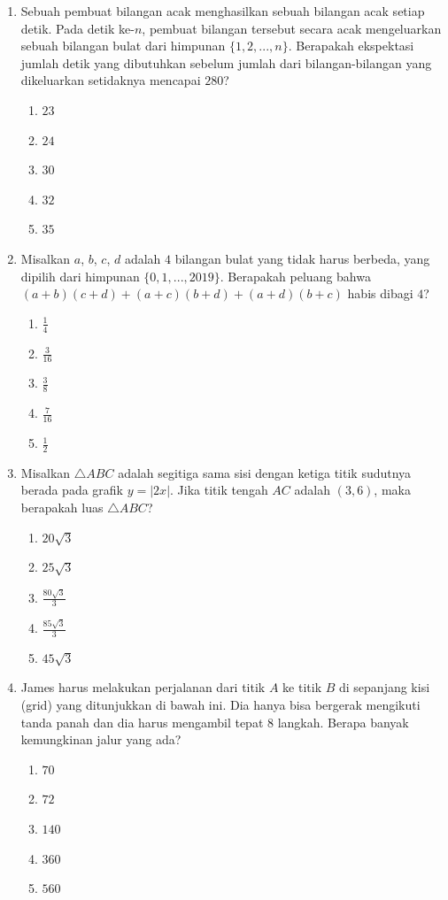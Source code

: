 \documentclass[12pt]{scrartcl}
\begin{document}
\begin{enumerate}
\item Sebuah pembuat bilangan acak menghasilkan sebuah bilangan acak setiap detik. Pada detik ke-$n$, pembuat bilangan tersebut secara acak mengeluarkan sebuah bilangan bulat dari himpunan $\{1,2,..., n\}$. Berapakah ekspektasi jumlah detik yang dibutuhkan sebelum jumlah dari bilangan-bilangan yang dikeluarkan setidaknya mencapai $280$?
\begin{enumerate}
    \item $23$
    \item $24$
    \item $30$
    \item $32$
    \item $35$
\end{enumerate}

\item Misalkan $a$, $b$, $c$, $d$ adalah $4$ bilangan bulat yang tidak harus berbeda, yang dipilih dari himpunan $\{0,1,..., 2019\}$. Berapakah peluang bahwa $(a+b)(c+d)+(a+c)(b+d)+(a+d)(b+c)$ habis dibagi $4$?
\begin{enumerate}
    \item $\frac{1}{4}$
    \item $\frac{3}{16}$
    \item $\frac{3}{8}$
    \item $\frac{7}{16}$
    \item $\frac{1}{2}$
\end{enumerate}

\item Misalkan $\triangle ABC$ adalah segitiga sama sisi dengan ketiga titik sudutnya berada pada grafik $y=|2x|$. Jika titik tengah $AC$ adalah $(3,6)$, maka berapakah luas $\triangle ABC$?
\begin{enumerate}
    \item $20\sqrt{3}$
    \item $25\sqrt{3}$
    \item $\frac{80\sqrt{3}}{3}$
    \item $\frac{85\sqrt{3}}{3}$
    \item $45\sqrt{3}$
\end{enumerate}

\item James harus melakukan perjalanan dari titik $A$ ke titik $B$ di sepanjang kisi (grid) yang ditunjukkan di bawah ini. Dia hanya bisa bergerak mengikuti tanda panah dan dia harus mengambil tepat $8$ langkah. Berapa banyak kemungkinan jalur yang ada?
\begin{enumerate}
    \item $70$
    \item $72$
    \item $140$
    \item $360$
    \item $560$
\end{enumerate}


\end{enumerate}
\end{document}
